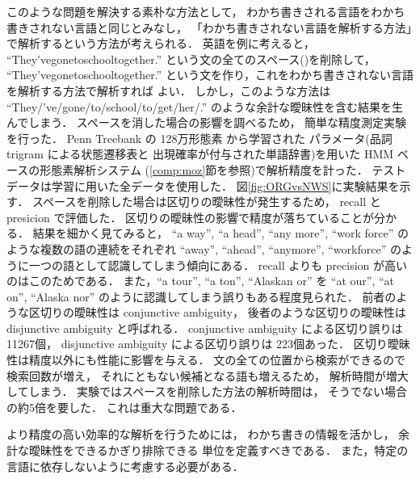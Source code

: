 このような問題を解決する素朴な方法として，
わかち書きされる言語をわかち書きされない言語と同じとみなし，
「わかち書きされない言語を解析する方法」で解析するという方法が考えられる．
英語を例に考えると，
``They've{\delimi}gone{\delimi}to{\delimi}school{\delimi}together.''
という文の全てのスペース({\delimi})を削除して，
``They'vegonetoschooltogether.''
という文を作り，これをわかち書きされない言語を解析する方法で解析すれば
よい\cite{Mills98}．
しかし，このような方法は
 ``They/'ve/gone/to/school/to/get/her/.'' 
のような余計な曖昧性を含む結果を生んでしまう．
スペースを消した場合の影響を調べるため，
簡単な精度測定実験を行った．
Penn Treebank\cite{PennTreebank90} の 128万形態素 から学習された
パラメータ(品詞 trigram による状態遷移表と
出現確率が付与された単語辞書)を用いた
HMM ベースの形態素解析システム \moz(\ref{comp:moz}節を参照)で解析精度を計った．
テストデータは学習に用いた全データを使用した．
図\ref{fig:ORGvsNWS}に実験結果を示す．
スペースを削除した場合は区切りの曖昧性が発生するため，
recall と presicion で評価した．
区切りの曖昧性の影響で精度が落ちていることが分かる．
結果を細かく見てみると，
``a way'', ``a head'',  ``any more'', ``work force''
のような複数の語の連続をそれぞれ
 ``away'', ``ahead'', ``anymore'', ``workforce''
のように一つの語として認識してしまう傾向にある．
recall よりも precision が高いのはこのためである．
また，``a tour'', ``a ton'', ``Alaskan or''
を ``at our'', ``at on'', ``Alaska nor''
のように認識してしまう誤りもある程度見られた．
前者のような区切りの曖昧性は conjunctive ambiguity，
後者のような区切りの曖昧性は disjunctive ambiguity
と呼ばれる\cite{Webster92}\cite{Guo97}．
conjunctive ambiguity による区切り誤りは 11267個，
disjunctive ambiguity による区切り誤りは 223個あった．
区切り曖昧性は精度以外にも性能に影響を与える．
文の全ての位置から検索ができるので検索回数が増え，
それにともない候補となる語も増えるため，
解析時間が増大してしまう．
実験ではスペースを削除した方法の解析時間は，
そうでない場合の約5倍を要した．
これは重大な問題である．

より精度の高い効率的な解析を行うためには，
わかち書きの情報を活かし，
余計な曖昧性をできるかぎり排除できる
単位を定義すべきである．
また，特定の言語に依存しないように考慮する必要がある．

